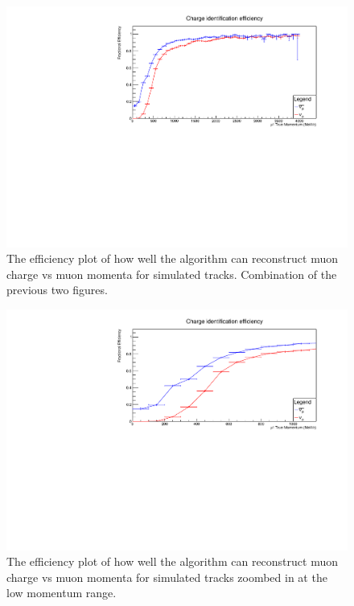 \begin{figure}[h!]
\centering
\includegraphics[width=.9\textwidth]{figures/NeutrinoChap/NuFactTalk/fix3.pdf}
\caption{The efficiency plot of how well the algorithm can reconstruct muon charge vs muon momenta for simulated tracks. Combination of the previous two figures.}
\label{fig:IronMINDCombined}
\end{figure}

\begin{figure}[h!]
\centering
\includegraphics[width=.9\textwidth]{figures/NeutrinoChap/NuFactTalk/fix4.pdf}
\caption{The efficiency plot of how well the algorithm can reconstruct muon charge vs muon momenta for simulated tracks zoombed in at the low momentum range.}
\label{fig:IronMINDCombinedZoom}
\end{figure}



